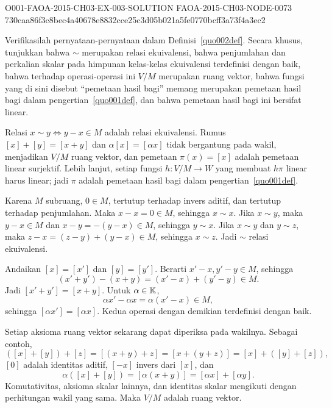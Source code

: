 \begin{o001solution}
  {O001-FAOA-2015-CH03-EX-003-SOLUTION}
  {FAOA-2015-CH03-NODE-0073}
  {730caa86f3c8bec4a40678e8832cce25c3d05b021a5fe0770bcff3a73f4a3ec2}
\begin{o001statement}
Verifikasilah pernyataan-pernyataan dalam Definisi~\ref{quo002def}. Secara khusus,
tunjukkan bahwa $\sim$ merupakan relasi ekuivalensi, bahwa penjumlahan dan perkalian skalar pada
himpunan kelas-kelas ekuivalensi terdefinisi dengan baik, bahwa terhadap operasi-operasi ini $V/M$ merupakan
ruang vektor, bahwa fungsi yang di sini disebut ``pemetaan hasil bagi'' memang merupakan pemetaan hasil bagi
dalam pengertian~\ref{quo001def}, dan bahwa pemetaan hasil bagi ini bersifat linear.
\end{o001statement}
\begin{o001answer}
Relasi $x\sim y\iff y-x\in M$ adalah relasi ekuivalensi. Rumus
$[x]+[y]=[x+y]$ dan $\alpha[x]=[\alpha x]$ tidak bergantung pada wakil,
menjadikan $V/M$ ruang vektor, dan pemetaan
$\pi(x)=[x]$ adalah pemetaan linear surjektif. Lebih lanjut, setiap fungsi
$h\colon V/M\to W$ yang membuat $h\pi$ linear harus linear; jadi $\pi$
adalah pemetaan hasil bagi dalam pengertian~\ref{quo001def}.
\end{o001answer}
\begin{o001proof}
Karena $M$ subruang, $0\in M$, tertutup terhadap invers aditif, dan tertutup
terhadap penjumlahan. Maka $x-x=0\in M$, sehingga $x\sim x$. Jika
$x\sim y$, maka $y-x\in M$ dan $x-y=-(y-x)\in M$, sehingga $y\sim x$.
Jika $x\sim y$ dan $y\sim z$, maka
$z-x=(z-y)+(y-x)\in M$, sehingga $x\sim z$. Jadi $\sim$ relasi
ekuivalensi.

Andaikan $[x]=[x']$ dan $[y]=[y']$. Berarti $x'-x,y'-y\in M$, sehingga
\[
(x'+y')-(x+y)=(x'-x)+(y'-y)\in M.
\]
Jadi $[x'+y']=[x+y]$. Untuk $\alpha\in\mathbb{K}$,
\[
\alpha x'-\alpha x=\alpha(x'-x)\in M,
\]
sehingga $[\alpha x']=[\alpha x]$. Kedua operasi dengan demikian
terdefinisi dengan baik.

Setiap aksioma ruang vektor sekarang dapat diperiksa pada wakilnya. Sebagai
contoh,
\[
([x]+[y])+[z]=[(x+y)+z]=[x+(y+z)]=[x]+([y]+[z]),
\]
$[0]$ adalah identitas aditif, $[-x]$ invers dari $[x]$, dan
\[
\alpha([x]+[y])=[\alpha(x+y)]
=[\alpha x]+[\alpha y].
\]
Komutativitas, aksioma skalar lainnya, dan identitas skalar mengikuti dengan
perhitungan wakil yang sama. Maka $V/M$ adalah ruang vektor.


\end{o001proof}
\end{o001solution}
